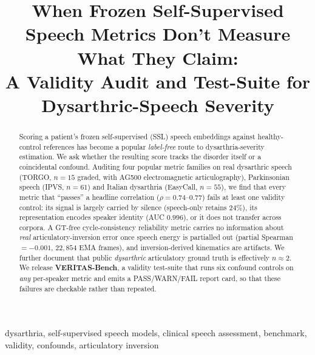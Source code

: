 \documentclass[conference]{IEEEtran}
\begin{document}
\title{When Frozen Self-Supervised Speech Metrics Don't Measure What They Claim:\\
A Validity Audit and Test-Suite for Dysarthric-Speech Severity}

\author{
}

\maketitle

\begin{abstract}
Scoring a patient's frozen self-supervised (SSL) speech embeddings against
healthy-control references has become a popular \emph{label-free} route to
dysarthria-severity estimation. We ask whether the resulting score tracks the
disorder itself or a coincidental confound. Auditing four popular metric families
on real dysarthric speech (TORGO, $n{=}15$ graded, with AG500 electromagnetic
articulography), Parkinsonian speech (IPVS, $n{=}61$) and Italian dysarthria
(EasyCall, $n{=}55$), we find that every metric that ``passes'' a headline
correlation ($\rho{=}0.74$--$0.77$) fails at least one validity control:
its signal is largely carried by silence (speech-only retains $24\%$), its
representation encodes speaker identity (AUC $0.996$), or it does not transfer
across corpora. A GT-free cycle-consistency reliability metric carries no
information about \emph{real} articulatory-inversion error once speech energy is
partialled out (partial Spearman $=-0.001$, $22{,}854$ EMA frames), and
inversion-derived kinematics are artifacts. We further document that public
\emph{dysarthric} articulatory ground truth is effectively $n{\approx}2$. We
release \textbf{VERITAS-Bench}, a validity test-suite that runs six confound
controls on \emph{any} per-speaker metric and emits a PASS/WARN/FAIL report card,
so that these failures are checkable rather than repeated.
\end{abstract}

\begin{IEEEkeywords}
dysarthria, self-supervised speech models, clinical speech assessment,
benchmark, validity, confounds, articulatory inversion
\end{IEEEkeywords}

\end{document}
